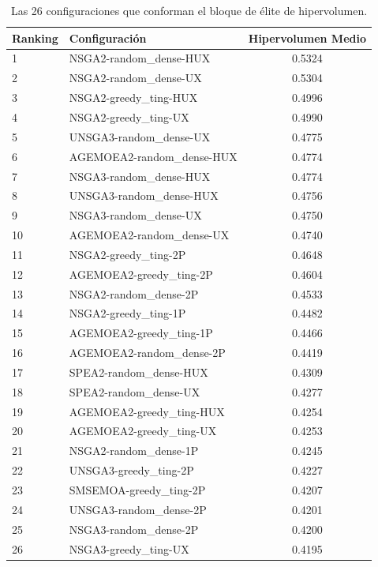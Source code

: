 \begin{table}[H]
    \centering
    \begin{tabular}{llc}
        \toprule
        \textbf{Ranking} & \textbf{Configuración} & \textbf{Hipervolumen Medio} \\
        \midrule
        1 & NSGA2-random\_dense-HUX & 0.5324 \\
        2 & NSGA2-random\_dense-UX & 0.5304 \\
        3 & NSGA2-greedy\_ting-HUX & 0.4996 \\
        4 & NSGA2-greedy\_ting-UX & 0.4990 \\
        5 & UNSGA3-random\_dense-UX & 0.4775 \\
        6 & AGEMOEA2-random\_dense-HUX & 0.4774 \\
        7 & NSGA3-random\_dense-HUX & 0.4774 \\
        8 & UNSGA3-random\_dense-HUX & 0.4756 \\
        9 & NSGA3-random\_dense-UX & 0.4750 \\
        10 & AGEMOEA2-random\_dense-UX & 0.4740 \\
        11 & NSGA2-greedy\_ting-2P & 0.4648 \\
        12 & AGEMOEA2-greedy\_ting-2P & 0.4604 \\
        13 & NSGA2-random\_dense-2P & 0.4533 \\
        14 & NSGA2-greedy\_ting-1P & 0.4482 \\
        15 & AGEMOEA2-greedy\_ting-1P & 0.4466 \\
        16 & AGEMOEA2-random\_dense-2P & 0.4419 \\
        17 & SPEA2-random\_dense-HUX & 0.4309 \\
        18 & SPEA2-random\_dense-UX & 0.4277 \\
        19 & AGEMOEA2-greedy\_ting-HUX & 0.4254 \\
        20 & AGEMOEA2-greedy\_ting-UX & 0.4253 \\
        21 & NSGA2-random\_dense-1P & 0.4245 \\
        22 & UNSGA3-greedy\_ting-2P & 0.4227 \\
        23 & SMSEMOA-greedy\_ting-2P & 0.4207 \\
        24 & UNSGA3-random\_dense-2P & 0.4201 \\
        25 & NSGA3-random\_dense-2P & 0.4200 \\
        26 & NSGA3-greedy\_ting-UX & 0.4195 \\
        \bottomrule
    \end{tabular}
    \caption[Bloque de élite de Hipervolumen]{Las 26 configuraciones que conforman el bloque de élite de hipervolumen.}
    \label{tab:elite_hv}
\end{table}

